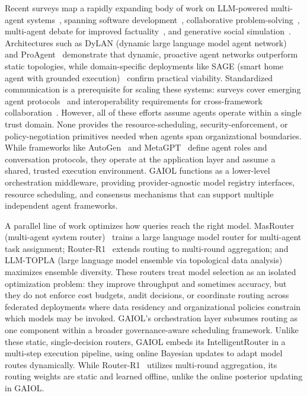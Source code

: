 \documentclass{iopjournal}
\begin{document}
Recent surveys map a rapidly expanding body of work on LLM-powered multi-agent systems~\cite{oh2015survey, dong2024large}, spanning software development~\cite{qian2024chatdev}, collaborative problem-solving~\cite{AgentVerse_EMNLP23}, multi-agent debate for improved factuality~\cite{Cooperation_NeurIPS23}, and generative social simulation~\cite{RolePlay_Nature23}. Architectures such as DyLAN (dynamic large language model agent network)~\cite{DyLAN_ICLR24} and ProAgent~\cite{ProAgent_AAAI24} demonstrate that dynamic, proactive agent networks outperform static topologies, while domain-specific deployments like SAGE (smart home agent with grounded execution)~\cite{SAGE_AAAI24} confirm practical viability. Standardized communication is a prerequisite for scaling these systems: surveys cover emerging agent protocols~\cite{AIAgentProtocols} and interoperability requirements for cross-framework collaboration~\cite{AgentInterop}. However, all of these efforts assume agents operate within a single trust domain. None provides the resource-scheduling, security-enforcement, or policy-negotiation primitives needed when agents span organizational boundaries. While frameworks like AutoGen~\cite{AutoGen} and MetaGPT~\cite{MetaGPT} define agent roles and conversation protocols, they operate at the application layer and assume a shared, trusted execution environment. GAIOL functions as a lower-level orchestration middleware, providing provider-agnostic model registry interfaces, resource scheduling, and consensus mechanisms that can support multiple independent agent frameworks.

A parallel line of work optimizes how queries reach the right model. MasRouter (multi-agent system router)~\cite{MasRouter} trains a large language model router for multi-agent task assignment; Router-R1~\cite{RouterR1} extends routing to multi-round aggregation; and LLM-TOPLA (large language model ensemble via topological data analysis)~\cite{LLMTOPLA} maximizes ensemble diversity. These routers treat model selection as an isolated optimization problem: they improve throughput and sometimes accuracy, but they do not enforce cost budgets, audit decisions, or coordinate routing across federated deployments where data residency and organizational policies constrain which models may be invoked. GAIOL's orchestration layer subsumes routing as one component within a broader governance-aware scheduling framework. Unlike these static, single-decision routers, GAIOL embeds its IntelligentRouter in a multi-step execution pipeline, using online Bayesian updates to adapt model routes dynamically. While Router-R1~\cite{RouterR1} utilizes multi-round aggregation, its routing weights are static and learned offline, unlike the online posterior updating in GAIOL.
\end{document}
